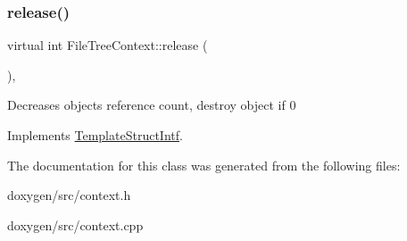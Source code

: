 \mbox{\label{class_file_tree_context_ac5ef9e8a6df42e2ee5c9f7c0fe33545c}} 
\subsubsection{\texorpdfstring{release()}{release()}}
{\footnotesize\ttfamily virtual int File\+Tree\+Context\+::release (\begin{DoxyParamCaption}{ }\end{DoxyParamCaption})\hspace{0.3cm}{\ttfamily [inline]}, {\ttfamily [virtual]}}

Decreases object\textquotesingle{}s reference count, destroy object if 0 

Implements \mbox{\hyperlink{class_template_struct_intf_a3dce7dd29d3f66a8080b40578e8a5045}{Template\+Struct\+Intf}}.



The documentation for this class was generated from the following files\+:\begin{DoxyCompactItemize}
\item 
doxygen/src/context.\+h\item 
doxygen/src/context.\+cpp\end{DoxyCompactItemize}
